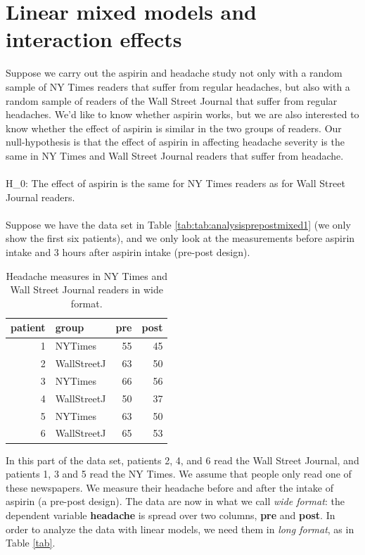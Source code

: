 \documentclass[]{report}\usepackage[]{graphicx}\usepackage[]{color}
\begin{document}
\section{Linear mixed models and interaction effects}


Suppose we carry out the aspirin and headache study not only with a random sample of NY Times readers that suffer from regular headaches, but also with a random sample of readers of the Wall Street Journal that suffer from regular headaches. We'd like to know whether aspirin works, but we are also interested to know whether the effect of aspirin is similar in the two groups of readers. Our null-hypothesis is that the effect of aspirin in affecting headache severity is the same in NY Times and Wall Street Journal readers that suffer from headache.\\
\\
H\_0: The effect of aspirin is the same for NY Times readers as for Wall Street Journal readers.
\\
\\
Suppose we have the data set in Table \ref{tab:tab:analysisprepostmixed1} (we only show the first six patients), and we only look at the measurements before aspirin intake and 3 hours after aspirin intake (pre-post design). 

\begin{table}[ht]
\centering
\caption{Headache measures in NY Times and Wall Street Journal readers in wide format.} 
\label{tab:analysisprepostmixed1}
\begin{tabular}{rlrr}
  \hline
patient & group & pre & post \\ 
  \hline
1 & NYTimes & 55 & 45 \\ 
  2 & WallStreetJ & 63 & 50 \\ 
  3 & NYTimes & 66 & 56 \\ 
  4 & WallStreetJ & 50 & 37 \\ 
  5 & NYTimes & 63 & 50 \\ 
  6 & WallStreetJ & 65 & 53 \\ 
   \hline
\end{tabular}
\end{table}




In this part of the data set, patients 2, 4, and 6 read the Wall Street Journal, and patients 1, 3 and 5 read the NY Times. We assume that people only read one of these newspapers. We measure their headache before and after the intake of aspirin (a pre-post design). The data are now in what we call \textit{wide format}: the dependent variable \textbf{headache} is spread over two columns, \textbf{pre} and \textbf{post}. In order to analyze the data with linear models, we need them in \textit{long format}, as in Table \ref{tab}. 
\end{document}
